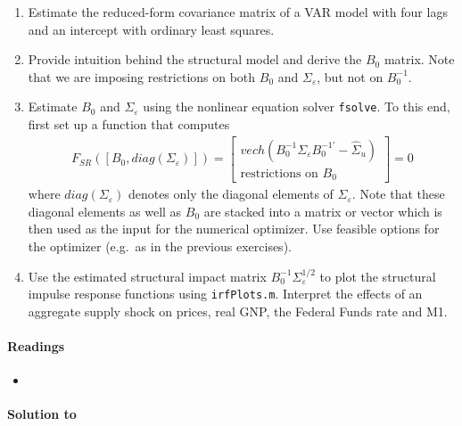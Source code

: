 \begin{enumerate}
\item Estimate the reduced-form covariance matrix of a VAR model with four lags and an intercept with ordinary least squares.

\item Provide intuition behind the structural model and derive the \(B_0\) matrix.
Note that we are imposing restrictions on both \(B_0\) and \(\Sigma_\varepsilon \), but not on \(B_0^{-1}\).

\item Estimate \(B_0\) and \(\Sigma_\varepsilon \) using the nonlinear equation solver \texttt{fsolve}.
To this end, first set up a function that computes
\begin{align*}
F_{SR}([B_0, diag(\Sigma_\varepsilon)]) = \begin{bmatrix} vech\left(B_0^{-1} \Sigma_\varepsilon B_0^{-1'} - \hat{\Sigma}_u\right)\\\text{restrictions on }B_0\end{bmatrix}=0
\end{align*}
where \(diag(\Sigma_\varepsilon)\) denotes only the diagonal elements of \(\Sigma_\varepsilon \).
Note that these diagonal elements as well as \(B_0\) are stacked into a matrix or vector which is then used as the input for the numerical optimizer.
Use feasible options for the optimizer (e.g.\ as in the previous exercises).

\item Use the estimated structural impact matrix \(B_0^{-1}\Sigma_\varepsilon^{1/2}\) to plot the structural impulse response functions using \texttt{irfPlots.m}.
Interpret the effects of an aggregate supply shock on prices, real GNP, the Federal Funds rate and M1.
\end{enumerate}

\paragraph{Readings}
\begin{itemize}
\item \textcite[Ch.~8-9]{Kilian.Lutkepohl_2017_StructuralVectorAutoregressive}
\end{itemize}

\begin{solution}\textbf{Solution to }
\ifDisplaySolutions

\fi
\newpage
\end{solution}